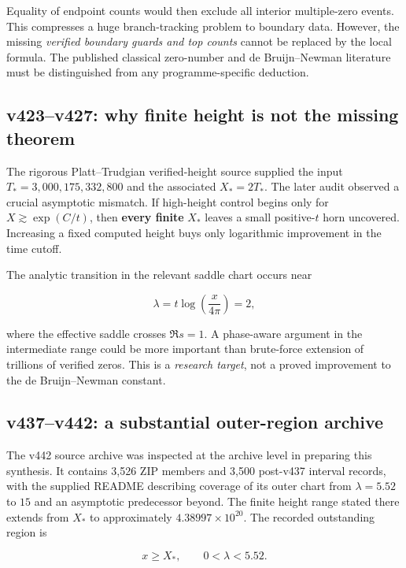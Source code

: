 \documentclass[
  10pt,
  a4paper,
  10pt,
  oneside,
  openany]{book}
\begin{document}
Equality of endpoint counts would then exclude all interior
multiple-zero events. This compresses a huge branch-tracking problem to
boundary data. However, the missing \emph{verified boundary guards and
top counts} cannot be replaced by the local formula. The published
classical zero-number and de Bruijn--Newman literature must be
distinguished from any programme-specific deduction.

\subsection{v423--v427: why finite height is not the missing
theorem}\label{v423v427-why-finite-height-is-not-the-missing-theorem}

The rigorous Platt--Trudgian verified-height source supplied the input
\(T_*=3{,}000{,}175{,}332{,}800\) and the associated \(X_*=2T_*\). The
later audit observed a crucial asymptotic mismatch. If high-height
control begins only for \(X\gtrsim \exp(C/t)\), then \textbf{every
finite} \(X_*\) leaves a small positive-\(t\) horn uncovered. Increasing
a fixed computed height buys only logarithmic improvement in the time
cutoff.

The analytic transition in the relevant saddle chart occurs near

\[
\lambda=t\log\!\left(\frac{x}{4\pi}\right)=2,
\tag{S4.6}\label{eq:S4.6}
\]

where the effective saddle crosses \(\Re s=1\). A phase-aware argument
in the intermediate range could be more important than brute-force
extension of trillions of verified zeros. This is a \emph{research
target}, not a proved improvement to the de Bruijn--Newman constant.

\subsection{v437--v442: a substantial outer-region
archive}\label{v437v442-a-substantial-outer-region-archive}

The v442 source archive was inspected at the archive level in preparing
this synthesis. It contains 3,526 ZIP members and 3,500 post-v437
interval records, with the supplied README describing coverage of its
outer chart from \(\lambda=5.52\) to \(15\) and an asymptotic
predecessor beyond. The finite height range stated there extends from
\(X_*\) to approximately \(4.38997\times10^{20}\). The recorded
outstanding region is

\[
x\ge X_*,\qquad0<\lambda<5.52.
\tag{S4.7}\label{eq:S4.7}
\]
\end{document}
